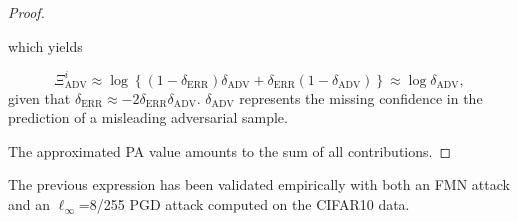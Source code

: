 \begin{proof}
\begin{description}
        which yields

        $$
        \Xi_{\text{ADV}}^i \approx \log \left\{ \left(1 - \delta_{\text{ERR}} \right) \delta_{\text{ADV}} + \delta_{\text{ERR}} \left(1 - \delta_{\text{ADV}} \right) \right\} \approx \log \delta_{\text{ADV}},
        $$
        given that $\delta_{\text{ERR}} \approx - 2 \delta_{\text{ERR}} \delta_{\text{ADV}}$. $\delta_{\text{ADV}}$ represents the missing confidence in 
        the prediction of a misleading adversarial sample.
    \end{description}

    The approximated PA value amounts to the sum of all contributions.
\end{proof}

The previous expression has been validated empirically with both an FMN attack
and an $\ell_{\infty}$=8/255 PGD attack computed on the CIFAR10 data.

